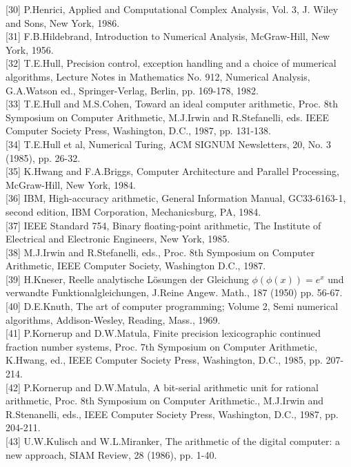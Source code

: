 \documentclass[10pt]{article}
\begin{document}
[30] P.Henrici, Applied and Computational Complex Analysis, Vol. 3, J. Wiley and Sons, New York, 1986.\\[0pt]
[31] F.B.Hildebrand, Introduction to Numerical Analysis, McGraw-Hill, New York, 1956.\\[0pt]
[32] T.E.Hull, Precision control, exception handling and a choice of mumerical algorithms, Lecture Notes in Mathematics No. 912, Numerical Analysis, G.A.Watson ed., Springer-Verlag, Berlin, pp. 169-178, 1982.\\[0pt]
[33] T.E.Hull and M.S.Cohen, Toward an ideal computer arithmetic, Proc. 8th Symposium on Computer Arithmetic, M.J.Irwin and R.Stefanelli, eds. IEEE Computer Society Press, Washington, D.C., 1987, pp. 131-138.\\[0pt]
[34] T.E.Hull et al, Numerical Turing, ACM SIGNUM Newsletters, 20, No. 3 (1985), pp. 26-32.\\[0pt]
[35] K.Hwang and F.A.Briggs, Computer Architecture and Parallel Processing, McGraw-Hill, New York, 1984.\\[0pt]
[36] IBM, High-accuracy arithmetic, General Information Manual, GC33-6163-1, second edition, IBM Corporation, Mechanicsburg, PA, 1984.\\[0pt]
[37] IEEE Standard 754, Binary floating-point arithmetic, The Institute of Electrical and Electronic Engineers, New York, 1985.\\[0pt]
[38] M.J.Irwin and R.Stefanelli, eds., Proc. 8th Symposium on Computer Arithmetic, IEEE Computer Society, Washington D.C., 1987.\\[0pt]
[39] H.Kneser, Reelle analytische Lösungen der Gleichung $\phi(\phi(x))=e^{x}$ und verwandte Funktionalgleichungen, J.Reine Angew. Math., 187 (1950) pp. 56-67.\\[0pt]
[40] D.E.Knuth, The art of computer programming; Volume 2, Semi numerical algorithms, Addison-Wesley, Reading, Mass., 1969.\\[0pt]
[41] P.Kornerup and D.W.Matula, Finite precision lexicographic continued fraction number systems, Proc. 7th Symposium on Computer Arithmetic, K.Hwang, ed., IEEE Computer Society Press, Washington, D.C., 1985, pp. 207-214.\\[0pt]
[42] P.Kornerup and D.W.Matula, A bit-serial arithmetic unit for rational arithmetic, Proc. 8th Symposium on Computer Arithmetic., M.J.Irwin and R.Stenanelli, eds., IEEE Computer Society Press, Washington, D.C., 1987, pp. 204-211.\\[0pt]
[43] U.W.Kulisch and W.L.Miranker, The arithmetic of the digital computer: a new approach, SIAM Review, 28 (1986), pp. 1-40.\\[0pt]
\end{document}
